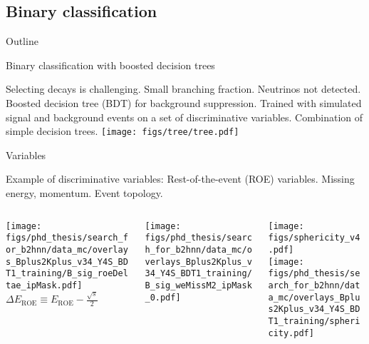 \subsection{Binary classification}
\begin{frame}[noframenumbering]{Outline}
 \tableofcontents[currentsection, currentsubsection, subsubsectionstyle=hide]
\end{frame}
\begin{frame}{Binary classification with boosted decision trees}
\bi
\item Selecting \BKpnn decays is challenging.
\bi
\itemiii Small branching fraction.
\itemiii Neutrinos not detected.
\ei
\itemii Boosted decision tree (BDT) for background suppression.
\bi
\itemiii Trained with simulated signal and background events on a set of discriminative variables.
\itemiii Combination of simple decision trees.
\ei
\ei
\vspace{0.25cm}
\centering
\texttt{[image: figs/tree/tree.pdf]}
\end{frame}
\begin{frame}{Variables}
\bi
\item Example of discriminative variables:
\bi
\itemiii Rest-of-the-event (ROE) variables.
\itemiii Missing energy, momentum.
\itemiii Event topology.
\ei
\ei
\vspace{0.5cm}
\centering
\begin{columns}
\begin{column}{0.333\linewidth}
\centering
\texttt{[image: figs/phd\_thesis/search\_for\_b2hnn/data\_mc/overlays\_Bplus2Kplus\_v34\_Y4S\_BDT1\_training/B\_sig\_roeDeltae\_ipMask.pdf]}
$\Delta E_{\mathrm{ROE}}\equiv E_{\mathrm{ROE}}-\frac{\sqrt{s}}{2}$ 
\end{column}
\begin{column}{0.333\linewidth}
\vspace{-0.6cm}
\centering
\texttt{[image: figs/phd\_thesis/search\_for\_b2hnn/data\_mc/overlays\_Bplus2Kplus\_v34\_Y4S\_BDT1\_training/B\_sig\_weMissM2\_ipMask\_0.pdf]}
\end{column}
\begin{column}{0.333\linewidth}
\centering
\vspace{-2.65cm}
\texttt{[image: figs/sphericity\_v4.pdf]}\\
\vspace{0.3cm}
\texttt{[image: figs/phd\_thesis/search\_for\_b2hnn/data\_mc/overlays\_Bplus2Kplus\_v34\_Y4S\_BDT1\_training/sphericity.pdf]}
\end{column}
\end{columns}
\end{frame}
